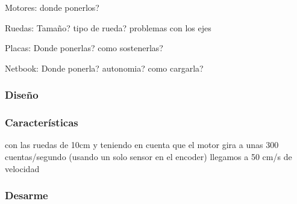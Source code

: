 Motores:
donde ponerlos?

Ruedas:
Tama\~no? tipo de rueda? problemas con los ejes

Placas:
Donde ponerlas? como sostenerlas?

Netbook:
Donde ponerla? autonomia? como cargarla?


\subsubsection{Dise\~no}
\label{h_prototipo_diseno}

\subsubsection{Caracter\'isticas}
\label{h_prototipo_caracteristicas}

con las ruedas de 10cm y teniendo en cuenta que el motor gira a unas 300 cuentas/segundo (usando un solo sensor en el encoder) llegamos a 50 cm/s de velocidad

\subsubsection{Desarme}
\label{h_prototipo_desarme}


